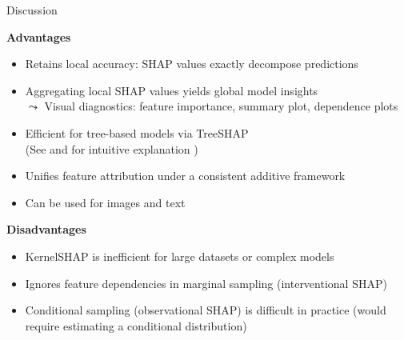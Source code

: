 \documentclass[11pt,compress,t,notes=noshow, aspectratio=169, xcolor=table]{beamer}
\begin{document}
\begin{frame}{Discussion}

\textbf{Advantages}

\begin{itemize}
    \item Retains local accuracy: SHAP values exactly decompose predictions
    \item Aggregating local SHAP values yields global model insights\\
    $\leadsto$ Visual diagnostics: feature importance, summary plot, dependence plots
    \item Efficient for tree-based models via TreeSHAP\\
    (See  and for intuitive explanation )
    \item Unifies feature attribution under a consistent additive framework
    
    \item Can be used for images   and text 
\end{itemize}

\medskip

\textbf{Disadvantages}

\begin{itemize}
  \item KernelSHAP is inefficient for large datasets or complex models
   \item Ignores feature dependencies in marginal sampling (interventional SHAP)
   \item Conditional sampling (observational SHAP) is difficult in practice (would require estimating a conditional distribution)
 

\end{itemize}
\end{frame}
\end{document}
